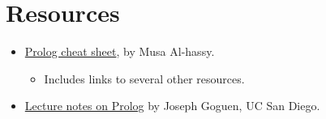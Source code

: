 \documentclass[11pt]{article}
\begin{document}
\section{Resources}
\label{sec:orgf3fa77b}
\begin{itemize}
\item \href{https://github.com/alhassy/PrologCheatSheet}{Prolog cheat sheet},
by Musa Al-hassy.
\begin{itemize}
\item Includes links to several other resources.
\end{itemize}
\item \href{https://cseweb.ucsd.edu/\~goguen/courses/130w04/prolog.html}{Lecture notes on Prolog}
by Joseph Goguen, UC San Diego.
\end{itemize}
\end{document}

